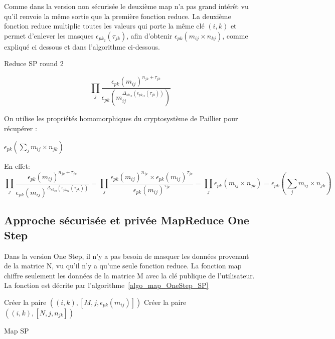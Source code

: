Comme dans la version non sécurisée le deuxième map n'a pas grand intérêt vu qu'il renvoie la même sortie que la première fonction reduce.
La deuxième fonction reduce multiplie toutes les valeurs qui  porte la même clé $(i,k)$ et permet d'enlever les masques $\epsilon_{pk_{2}}(\tau_{jk})$, afin 
d'obtenir $\epsilon_{pk}( m_{ij} \times n_{kj})$, comme expliqué ci dessous et dans l'algorithme ci-dessous.
\littlesectionspace
\begin{algorithm}[H]
  \caption{Reduce SP round 2}
  \label{algo_Reduce2_SP}
  \begin{algorithmic} 
    \State 
			\[
                   \prod_{j} \frac{ \epsilon_{pk}(m_{ij})^{n_{jk} + \tau _{jk}} }{ \epsilon_{pk}(m_{ij}^{\Delta_{sk_{r2}}(\epsilon_{pk_{r2}}(\tau_{jk}))}) }
             \]      
    \EndFor
  \end{algorithmic}
\end{algorithm}

\bigskip
On utilise les propriétés homomorphiques du cryptosystème de Paillier pour récupérer :
\begin{center}
$\epsilon_{pk}(\sum_{j} m_{ij} \times n_{jk})$
\end{center}
En effet:
\[
	 \prod_{j} \frac{ \epsilon_{pk}(m_{ij})^{ n_{jk} + \tau_{jk} } }{ \epsilon_{pk}(m_{ij})^{\Delta_{sk_{r2}}(\epsilon_{pk_{r2}}(\tau_{jk}))}} =
	  \prod_{j} \frac{ \epsilon_{pk}(m_{ij})^{n_{jk}} \times \epsilon_{pk}(m_{ij})^{\tau_{jk}} }{ \epsilon_{pk}(m_{ij})^{\tau_{jk}} } =
	  \prod_{j} \epsilon_{pk}(m_{ij} \times  n_{jk}) =
	  \epsilon_{pk}( \sum_{j} m_{ij} \times n_{jk}) 
\]

\subsection{Approche sécurisée et privée MapReduce One Step}

Dans la version One Step, il n'y a pas besoin de masquer les données provenant de la matrice N, vu qu'il n'y a qu'une seule fonction reduce.  
La fonction map chiffre seulement les données de la matrice M avec la clé publique de l'utilisateur. La fonction est décrite par l'algorithme~\ref{algo_map_OneStep_SP}

\begin{algorithm}[H]
  \label{algo_map_OneStep_SP}
  \begin{algorithmic}
    \State {}
    \State Cr\'{e}er la paire $((i,k),[M,j,\epsilon_{pk}(m_{ij})])$
    \EndFor
    \EndFor
	\State {}
    \State Cr\'{e}er la paire $((i,k),[N,j,n_{jk}])$
    \EndFor
    \EndFor
  \end{algorithmic}
\caption{Map SP}
\end{algorithm}

